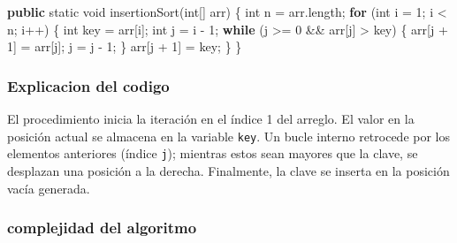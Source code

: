 \documentclass[
  spanish,
  letterpaper,
  DIV=11,
  numbers=noendperiod]{scrreprt}
\newenvironment{Shaded}{\begin{snugshade}}{\end{snugshade}}
\newcommand{\ControlFlowTok}[1]{\textcolor[rgb]{0.00,0.23,0.31}{\textbf{#1}}}
\newcommand{\DataTypeTok}[1]{\textcolor[rgb]{0.68,0.00,0.00}{#1}}
\newcommand{\DecValTok}[1]{\textcolor[rgb]{0.68,0.00,0.00}{#1}}
\newcommand{\FunctionTok}[1]{\textcolor[rgb]{0.28,0.35,0.67}{#1}}
\newcommand{\KeywordTok}[1]{\textcolor[rgb]{0.00,0.23,0.31}{\textbf{#1}}}
\newcommand{\NormalTok}[1]{\textcolor[rgb]{0.00,0.23,0.31}{#1}}
\newcommand{\OperatorTok}[1]{\textcolor[rgb]{0.37,0.37,0.37}{#1}}
\begin{document}
\begin{Shaded}
\begin{Highlighting}[]
\KeywordTok{public} \DataTypeTok{static} \DataTypeTok{void} \FunctionTok{insertionSort}\OperatorTok{(}\DataTypeTok{int}\OperatorTok{[]}\NormalTok{ arr}\OperatorTok{)} \OperatorTok{\{}
    \DataTypeTok{int}\NormalTok{ n }\OperatorTok{=}\NormalTok{ arr}\OperatorTok{.}\FunctionTok{length}\OperatorTok{;}
    \ControlFlowTok{for} \OperatorTok{(}\DataTypeTok{int}\NormalTok{ i }\OperatorTok{=} \DecValTok{1}\OperatorTok{;}\NormalTok{ i }\OperatorTok{\textless{}}\NormalTok{ n}\OperatorTok{;}\NormalTok{ i}\OperatorTok{++)} \OperatorTok{\{}
        \DataTypeTok{int}\NormalTok{ key }\OperatorTok{=}\NormalTok{ arr}\OperatorTok{[}\NormalTok{i}\OperatorTok{];}
        \DataTypeTok{int}\NormalTok{ j }\OperatorTok{=}\NormalTok{ i }\OperatorTok{{-}} \DecValTok{1}\OperatorTok{;}
        \ControlFlowTok{while} \OperatorTok{(}\NormalTok{j }\OperatorTok{\textgreater{}=} \DecValTok{0} \OperatorTok{\&\&}\NormalTok{ arr}\OperatorTok{[}\NormalTok{j}\OperatorTok{]} \OperatorTok{\textgreater{}}\NormalTok{ key}\OperatorTok{)} \OperatorTok{\{}
\NormalTok{            arr}\OperatorTok{[}\NormalTok{j }\OperatorTok{+} \DecValTok{1}\OperatorTok{]} \OperatorTok{=}\NormalTok{ arr}\OperatorTok{[}\NormalTok{j}\OperatorTok{];}
\NormalTok{            j }\OperatorTok{=}\NormalTok{ j }\OperatorTok{{-}} \DecValTok{1}\OperatorTok{;}
        \OperatorTok{\}}
\NormalTok{        arr}\OperatorTok{[}\NormalTok{j }\OperatorTok{+} \DecValTok{1}\OperatorTok{]} \OperatorTok{=}\NormalTok{ key}\OperatorTok{;}
    \OperatorTok{\}}
\OperatorTok{\}}
\end{Highlighting}
\end{Shaded}

\subsubsection{\texorpdfstring{\textbf{Explicacion del
codigo}}{Explicacion del codigo}}\label{explicacion-del-codigo}

El procedimiento inicia la iteración en el índice 1 del arreglo. El
valor en la posición actual se almacena en la variable \texttt{key}. Un
bucle interno retrocede por los elementos anteriores (índice
\texttt{j}); mientras estos sean mayores que la clave, se desplazan una
posición a la derecha. Finalmente, la clave se inserta en la posición
vacía generada.

\subsubsection{\texorpdfstring{\textbf{complejidad del
algoritmo}}{complejidad del algoritmo}}\label{complejidad-del-algoritmo}
\end{document}
